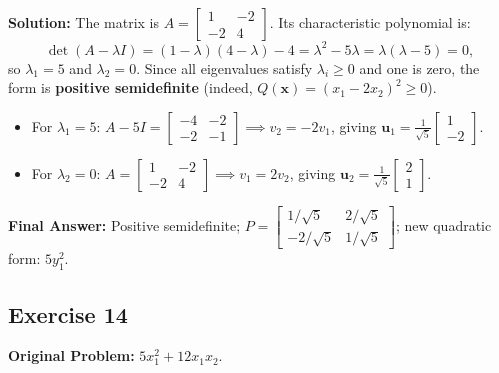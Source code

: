 \documentclass[11pt, letterpaper]{article}
\theoremstyle{definition}
\theoremstyle{remark}
\begin{document}
\textbf{Solution:}
The matrix is $A = \begin{bmatrix} 1 & -2 \\ -2 & 4 \end{bmatrix}$. Its characteristic polynomial is:
\[
\det(A - \lambda I) = (1-\lambda)(4-\lambda) - 4 = \lambda^2 - 5\lambda = \lambda(\lambda - 5) = 0,
\]
so $\lambda_1 = 5$ and $\lambda_2 = 0$. Since all eigenvalues satisfy $\lambda_i \ge 0$ and one is zero, the form is \textbf{positive semidefinite} (indeed, $Q(\mathbf{x}) = (x_1 - 2x_2)^2 \ge 0$).
\begin{itemize}
    \item For $\lambda_1 = 5$: $A - 5I = \begin{bmatrix} -4 & -2 \\ -2 & -1 \end{bmatrix} \implies v_2 = -2v_1$, giving $\mathbf{u}_1 = \frac{1}{\sqrt{5}}\begin{bmatrix} 1 \\ -2 \end{bmatrix}$.
    \item For $\lambda_2 = 0$: $A = \begin{bmatrix} 1 & -2 \\ -2 & 4 \end{bmatrix} \implies v_1 = 2v_2$, giving $\mathbf{u}_2 = \frac{1}{\sqrt{5}}\begin{bmatrix} 2 \\ 1 \end{bmatrix}$.
\end{itemize}
\textbf{Final Answer:} Positive semidefinite; $P = \begin{bmatrix} 1/\sqrt{5} & 2/\sqrt{5} \\ -2/\sqrt{5} & 1/\sqrt{5} \end{bmatrix}$; new quadratic form: $5y_1^2$.

\hrulefill

\subsection*{Exercise 14}
\textbf{Original Problem:} $5x_1^2 + 12x_1x_2$.
\end{document}
